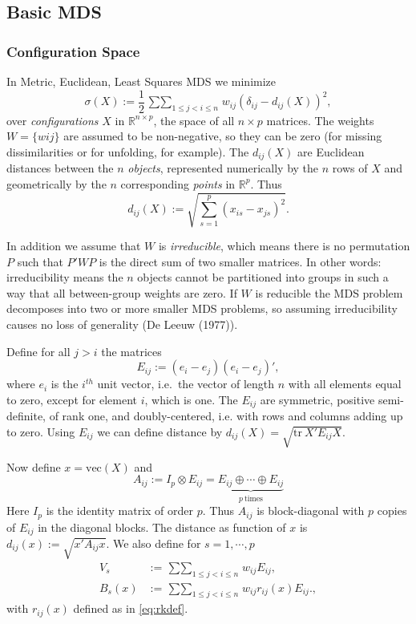 \documentclass[
  12pt,
]{article}
\newcommand{\jis}{\mathop{\sum\sum}_{1\leq j<i\leq n}}
\begin{document}
\subsection{Basic MDS}\label{basic-mds}

\subsubsection{Configuration Space}\label{configuration-space}

In Metric, Euclidean, Least Squares MDS we minimize
\begin{equation}
\sigma(X):=\frac12\jis w_{ij}(\delta_{ij}-d_{ij}(X))^2,
\label{eq:sdefconf}
\end{equation}
over \emph{configurations} \(X\) in \(\mathbb{R}^{n\times p}\), the space of all
\(n\times p\) matrices. The weights \(W=\{w{ij}\}\) are assumed to be
non-negative, so they can be zero (for missing dissimilarities or for
unfolding, for example). The \(d_{ij}(X)\) are Euclidean distances
between the \(n\) \emph{objects}, represented numerically by the \(n\) rows of \(X\)
and geometrically by the \(n\) corresponding \emph{points} in \(\mathbb{R}^p\). Thus
\begin{equation}
d_{ij}(X):=\sqrt{\sum_{s=1}^p(x_{is}-x_{js})^2}.
\label{eq:ddefconf}
\end{equation}

In addition we assume that \(W\) is \emph{irreducible}, which means there is no permutation
\(P\) such that \(P'WP\) is the direct sum of two smaller matrices. In other words: irreducibility means
the \(n\) objects cannot be partitioned into groups in such a way that all between-group
weights are zero. If \(W\) is reducible the MDS problem decomposes into two or more smaller MDS problems, so assuming irreducibility causes no loss of generality (De Leeuw (1977)).

Define for all \(j>i\) the matrices
\begin{equation}
E_{ij}:=(e_i-e_j)(e_i-e_j)',
\label{eq:adef}
\end{equation}
where \(e_i\) is the \(i^{th}\) unit vector, i.e.~the vector of length \(n\) with all elements equal to zero, except for element \(i\), which is one.
The \(E_{ij}\) are symmetric, positive semi-definite, of rank one, and doubly-centered, i.e.
with rows and columns adding up to zero.
Using \(E_{ij}\) we can define distance by
\(d_{ij}(X)=\sqrt{\text{tr}\ X'E_{ij}X}\).

Now define \(x=\text{vec}(X)\) and
\[
A_{ij}:=I_p\otimes E_{ij}=\underbrace{E_{ij}\oplus\cdots\oplus E_{ij}}_{p\ \text{times}}
\]
Here \(I_p\) is the identity matrix of order \(p\). Thus \(A_{ij}\) is block-diagonal with \(p\) copies of \(E_{ij}\) in the diagonal blocks. The distance as function of \(x\) is \(d_{ij}(x):=\sqrt{x'A_{ij}x}\).
We also define for \(s=1,\cdots,p\)
\begin{align}
V_s&:=\jis  w_{ij}E_{ij}\label{eq:vdef},\\
B_s(x)&:=\jis w_{ij}r_{ij}(x)E_{ij}.\label{eq:bdef},
\end{align}
with \(r_{ij}(x)\) defined as in \eqref{eq:rkdef}.
\end{document}
